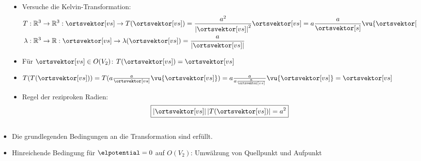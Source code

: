 \begin{frame}
\begin{columns}
\begin{column}{.35\textwidth}
      \end{column}
      \begin{column}{.5\textwidth}
        \begin{itemize}[<+->]
        \item Versuche die \alert{Kelvin-Transformation}:
          \begin{align*}
            T & :  \mathbb{R}^3 \to \mathbb{R}^3 : \ortsvektor[vs] \to T(\ortsvektor[vs]) = \frac{a^2}{\left| \ortsvektor[vs]\right|^2} \ortsvektor[vs] = a \frac{a}{\ortsvektor[s]} \vu{\ortsvektor[s]}\\
            \lambda & :  \mathbb{R}^3 \to \mathbb{R} : \ortsvektor[vs] \to \lambda(\ortsvektor[vs]) = \frac{a}{\left| \ortsvektor[vs]\right|}  
          \end{align*}
        \item Für $\ortsvektor[vs] \in O(V_2)$: $T(\ortsvektor[vs]) = \ortsvektor[vs]$
        \item $T(T(\ortsvektor[vs])) = T(a \frac{a}{\ortsvektor[vs]} \vu{\ortsvektor[vs]}) =  a \frac{a}{a \frac{a}{\ortsvektor[vs]}} \vu{\ortsvektor[vs]} = \ortsvektor[vs]$
        \item Regel der \alert{reziproken Radien}:
          \begin{equation*}
            \boxed{\left| \ortsvektor[vs] \right| \left| T(\ortsvektor[vs]) \right| = a^2}
            \end{equation*}
          \end{itemize}
        \end{column}
      \end{columns}
      \begin{itemize}[<+->]
        \item Die grundlegenden Bedingungen an die Transformation sind erfüllt. 
        \item Hinreichende Bedingung für $\elpotential = 0$ auf $O(V_2)$: Umwälzung von Quellpunkt und Aufpunkt
        \end{itemize}
\end{frame}

